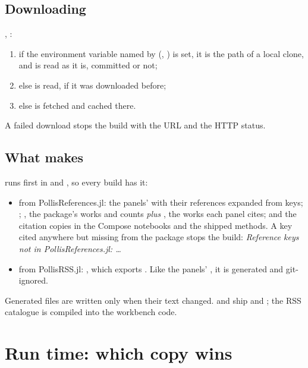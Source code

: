 \subsection{Downloading}
, :
\begin{enumerate}
  \item if the environment variable named by  (, ) is set, it is
    the path of a local clone, and  is read as it is, committed or not;
  \item else  is read, if it was downloaded before;
  \item else  is fetched and
    cached there.
\end{enumerate}
A failed download stops the build with the URL and the HTTP status.

\subsection{What \texorpdfstring{}{compile-toml} makes}
 runs first in  and , so every build has it:
\begin{itemize}
  \item from PollisReferences.jl: the panels'  with their references expanded from keys;
    ; , the package's works and counts \emph{plus}
    , the works each panel cites; and the citation copies in the Compose notebooks and the shipped methods.
    A key cited anywhere but missing from the package stops the build: \emph{Reference keys not in PollisReferences.jl:
    \ldots}
  \item from PollisRSS.jl: , which exports
    . Like the panels' , it is generated and git-ignored.
\end{itemize}
Generated files are written only when their text changed.  and
 ship  and ; the RSS catalogue is compiled into the
workbench code.

\section{Run time: which copy wins}\label{sec:runtime}

